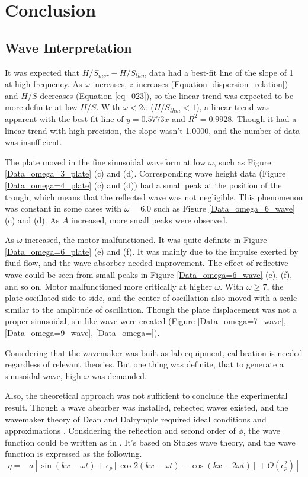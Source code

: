 \section{Conclusion}

\subsection{Wave Interpretation}
It was expected that $H/S_{msr} - H/S_{thm}$ data had a best-fit line of the slope of 1 at high frequency. As $\omega$ increases, $z$ increases (Equation \ref{dispersion_relation}) and $H/S$ decreases (Equation \ref{eq_023}), so the linear trend was expected to be more definite at low $H/S$. With $\omega < 2\pi$ ($H/S_{thm} < 1$), a linear trend was apparent with the best-fit line of $y=0.5773x$ and $R^{2} = 0.9928$. Though it had a linear trend with high precision, the slope wasn't 1.0000, and the number of data was insufficient. 

The plate moved in the fine sinusoidal waveform at low $\omega$, such as Figure \ref{Data_omega=3_plate} (c) and (d). Corresponding wave height data (Figure \ref{Data_omega=4_plate} (c) and (d)) had a small peak at the position of the trough, which means that the reflected wave was not negligible. This phenomenon was constant in some cases with $\omega=6.0$ such as Figure \ref{Data_omega=6_wave} (c) and (d). As $A$ increased, more small peaks were observed.

As $\omega$ increased, the motor malfunctioned. It was quite definite in Figure \ref{Data_omega=6_plate} (e) and (f). It was mainly due to the impulse exerted by fluid flow, and the wave absorber needed improvement. The effect of reflective wave could be seen from small peaks in Figure \ref{Data_omega=6_wave} (e), (f), and so on. Motor malfunctioned more critically at higher $\omega$. With $\omega\geq7$, the plate oscillated side to side, and the center of oscillation also moved with a scale similar to the amplitude of oscillation. Though the plate displacement was not a proper sinusoidal, sin-like wave were created (Figure \ref{Data_omega=7_wave}, \ref{Data_omega=9_wave}, \ref{Data_omega=}). 

Considering that the wavemaker was built as lab equipment, calibration is needed regardless of relevant theories. But one thing was definite, that to generate a sinusoidal wave, high $\omega$ was demanded.

Also, the theoretical approach was not sufficient to conclude the experimental result. Though a wave absorber was installed, reflected waves existed, and the wavemaker theory of Dean and Dalrymple required ideal conditions and approximations \cite{dean1991water}. Considering the reflection and second order of $\phi$, the wave function could be written as in \cite{madsen1971generation}. It's based on Stokes wave theory, and the wave function is expressed as the following.
\begin{equation}
    \eta = -a \left[ \sin{(kx - \omega t)} + \epsilon_{p} \left[\cos{2(kx - \omega t)} - \cos{(kx - 2\omega t)}\right] + O(\epsilon_{p}^{2}) \right]
    \label{Madsen1971}
\end{equation}

